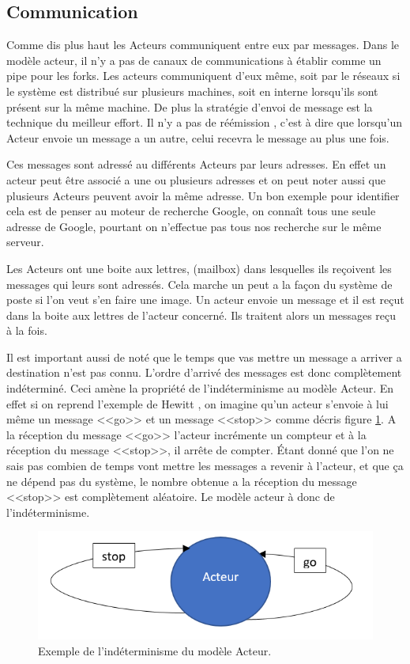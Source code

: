 \documentclass[12pt, a4paper]{article}
\begin{document}
\subsection{Communication}

Comme dis plus haut les Acteurs communiquent entre eux par messages. Dans le modèle acteur, il n'y a pas de canaux de communications à établir comme un pipe pour les forks. Les acteurs communiquent d'eux même, soit par le réseaux si le système est distribué sur plusieurs machines, soit en interne lorsqu'ils sont présent sur la même machine. De plus la stratégie d'envoi de message est la technique du meilleur effort. Il n'y a pas de réémission , c'est à dire que lorsqu'un Acteur envoie un message a un autre, celui recevra le message au plus une fois. 
\par Ces messages sont adressé au différents Acteurs par leurs adresses. En effet un acteur peut être associé a une ou plusieurs adresses et on peut noter aussi que plusieurs Acteurs peuvent avoir la même adresse. Un bon exemple pour identifier cela est de penser au moteur de recherche Google, on connaît tous une seule adresse de Google, pourtant on n'effectue pas tous nos recherche sur le même serveur.
\par Les Acteurs ont une boite aux lettres, (mailbox) dans lesquelles ils reçoivent les messages qui leurs sont adressés. Cela marche un peut a la façon du système de poste si l'on veut s'en faire une image. Un acteur envoie un message et il est reçut dans la boite aux lettres de l'acteur concerné. Ils traitent alors un messages reçu à la fois.
\par Il est important aussi de noté que le temps que vas mettre un message a arriver a destination n'est pas connu. L'ordre d'arrivé des messages est donc complètement indéterminé. Ceci amène la propriété de l'indéterminisme au modèle Acteur. En effet si on reprend l'exemple de Hewitt \cite{video_hewitt}, on imagine qu'un acteur s'envoie à lui même un message <<go>> et un message <<stop>> comme décris figure \ref{fig1}. A la réception du message <<go>> l'acteur incrémente un compteur et à la réception du message <<stop>>, il arrête de compter. Étant donné que l'on ne sais pas combien de temps vont mettre les messages a revenir à l'acteur, et que ça ne dépend pas du système, le nombre obtenue a la réception du message <<stop>> est complètement aléatoire. Le modèle acteur à donc de l'indéterminisme.

\begin{figure}
\center
\includegraphics[scale=0.5]{actor_underminisism}
\caption{Exemple de l'indéterminisme du modèle Acteur.}
\label{fig1}
\end{figure}
\end{document}
